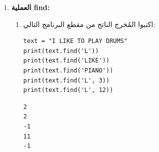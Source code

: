 \documentclass[14pt]{extarticle}
\begin{document}
\begin{enumerate}[resume, label=\textbf{تمرين \arabic*:}, wide=0pt, itemsep=2.2em]
\begin{enumerate}[label=\alph*.]
\item ماذا ينفّذ العامل \textenglish{in} بين سلسلتين نصّيتين؟
\ifwithsols
\begin{boxSolution}
يفحص ما إذا كانت السلسلة النصية الجزئية (على يسار \textenglish{in}) موجودة داخل السلسلة النصية الأصلية (على يمين \textenglish{in})، ويعيد \textenglish{True} إذا وُجدت أو \textenglish{False} إذا لم توجد.
\end{boxSolution}
\fi
\filbreak

\item اكتبوا مقطع برنامج يستقبل عددًا صحيحًا، ويفحص بواسطة العامل \textenglish{in} ما إذا كانت المنزلة $9$ أو المنزلة $3$ تظهر في العدد، ويطبع \textenglish{True} أو \textenglish{False}.
\ifwithsols
\begin{boxSolution}
\begin{english}
\begin{verbatim}
num = int(input("Enter an integer: "))
s = str(num)
print('9' in s or '3' in s)
\end{verbatim}
\end{english}
\end{boxSolution}
\fi
\filbreak
\end{enumerate}
\filbreak

\item \textbf{العملية \textenglish{find}:}
\begin{enumerate}[label=\alph*.]
\item اكتبوا المُخرج الناتج من مقطع البرنامج التالي:

\begin{boxCode}
\begin{english}
\begin{verbatim}
text = "I LIKE TO PLAY DRUMS"
print(text.find('L'))
print(text.find('LIKE'))
print(text.find('PIANO'))
print(text.find('L', 3))
print(text.find('L', 12))
\end{verbatim}
\end{english}
\end{boxCode}

\ifwithsols
\begin{boxSolution}
\begin{english}
\begin{verbatim}
2
2
-1
11
-1
\end{verbatim}
\end{english}
\end{boxSolution}
\fi
\filbreak


\end{enumerate}
\end{enumerate}
\end{document}
